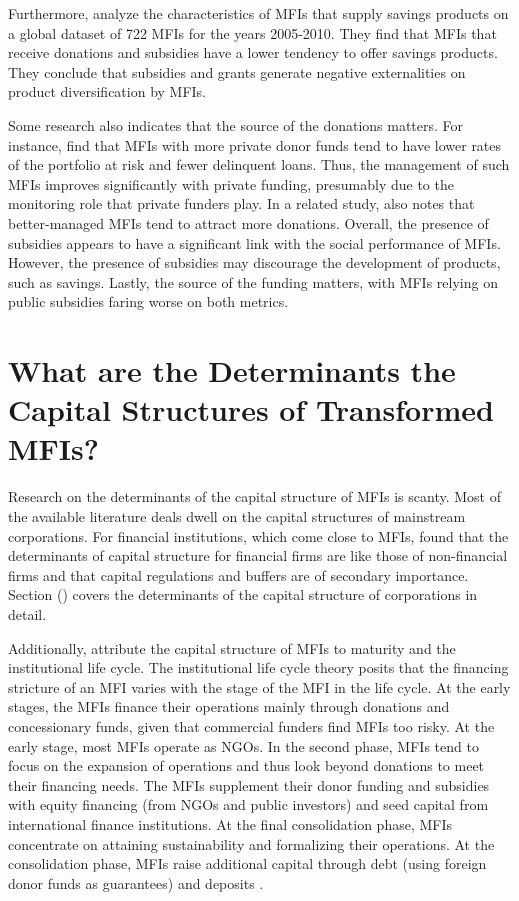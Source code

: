 \documentclass[a4paper, nobind]{templates/ociamthesis}
\begin{document}
Furthermore, \textcite{cozarenco2016type} analyze the characteristics of MFIs that supply savings products on a global dataset of 722 MFIs for the years 2005-2010. They find that MFIs that receive donations and subsidies have a lower tendency to offer savings products. They conclude that subsidies and grants generate negative externalities on product diversification by MFIs.

Some research also indicates that the source of the donations matters. For instance, \textcite{chakravarty2015role} find that MFIs with more private donor funds tend to have lower rates of the portfolio at risk and fewer delinquent loans. Thus, the management of such MFIs improves significantly with private funding, presumably due to the monitoring role that private funders play. In a related study, \textcite{hudon2010management} also notes that better-managed MFIs tend to attract more donations. Overall, the presence of subsidies appears to have a significant link with the social performance of MFIs. However, the presence of subsidies may discourage the development of products, such as savings. Lastly, the source of the funding matters, with MFIs relying on public subsidies faring worse on both metrics.

\hypertarget{what-are-the-determinants-the-capital-structures-of-transformed-mfis}{%
\section{What are the Determinants the Capital Structures of Transformed MFIs?}\label{what-are-the-determinants-the-capital-structures-of-transformed-mfis}}

Research on the determinants of the capital structure of MFIs is scanty. Most of the available literature deals dwell on the capital structures of mainstream corporations. For financial institutions, which come close to MFIs, \textcite{gropp2010determinants} found that the determinants of capital structure for financial firms are like those of non-financial firms and that capital regulations and buffers are of secondary importance. Section () covers the determinants of the capital structure of corporations in detail.

Additionally, \textcite{ledgerwood2006transforming} attribute the capital structure of MFIs to maturity and the institutional life cycle. The institutional life cycle theory posits that the financing stricture of an MFI varies with the stage of the MFI in the life cycle. At the early stages, the MFIs finance their operations mainly through donations and concessionary funds, given that commercial funders find MFIs too risky. At the early stage, most MFIs operate as NGOs. In the second phase, MFIs tend to focus on the expansion of operations and thus look beyond donations to meet their financing needs. The MFIs supplement their donor funding and subsidies with equity financing (from NGOs and public investors) and seed capital from international finance institutions. At the final consolidation phase, MFIs concentrate on attaining sustainability and formalizing their operations. At the consolidation phase, MFIs raise additional capital through debt (using foreign donor funds as guarantees) and deposits \textcite{bayai2016financing}.
\end{document}
